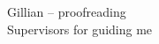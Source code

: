 \begin{acknowledgements}

    Gillian -- proofreading\\
    Supervisors for guiding me
    \vspace{7mm}

\end{acknowledgements}
